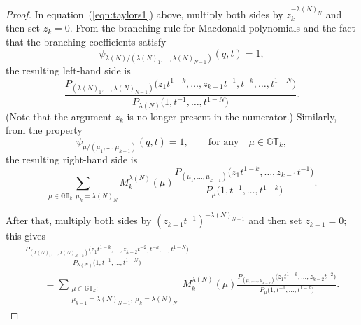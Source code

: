 \documentclass[pdftex]{sigma}
\numberwithin{equation}{section}
\newcommand{\GT}{\mathbb{GT}}
\begin{document}
\begin{proof}
In equation~(\ref{eqn:taylors1}) above, multiply both sides by $z_k^{-\lambda(N)_N}$ and then set $z_k = 0$.
From the branching rule for Macdonald polynomials and the fact that the branching coef\/f\/icients satisfy
\[
\psi_{\lambda(N)/(\lambda(N)_1, \dots, \lambda(N)_{N-1})}(q, t) = 1,
\]
the resulting left-hand side is
\[
\frac{P_{(\lambda(N)_1, \dots, \lambda(N)_{N-1})}\big(z_1 t^{1-k}, \dots, z_{k-1}t^{-1}, t^{-k}, \dots, t^{1-N}\big)}{P_{\lambda(N)}\big(1, t^{-1}, \dots, t^{1-N}\big)}.
\]
(Note that the argument $z_k$ is no longer present in the numerator.) Similarly, from the property
\[
\psi_{\mu/(\mu_1, \dots, \mu_{k-1})}(q, t) = 1, \qquad \textrm{for any} \quad \mu\in\GT_k,
\]
the resulting right-hand side is
\[
\sum_{\mu\in\GT_k\colon \mu_k = \lambda(N)_N}{M_k^{\lambda(N)}(\mu) \frac{P_{(\mu_1, \dots, \mu_{k-1})}\big(z_1t^{1-k}, \dots, z_{k-1}t^{-1}\big)}{P_{\mu}\big(1, t^{-1}, \dots, t^{1-k}\big)}}.
\]

After that, multiply both sides by $(z_{k-1}t^{-1})^{-\lambda(N)_{N-1}}$ and then set $z_{k-1}=0$; this gives
\begin{gather*}
\frac{P_{(\lambda(N)_1, \dots, \lambda(N)_{N-2})}\big(z_1 t^{1-k}, \dots, z_{k-2}t^{-2}, t^{-k}, \dots, t^{1-N}\big)}{P_{\lambda(N)}\big(1, t^{-1}, \dots, t^{1-N}\big)}\\
\qquad{} = \sum_{\substack{ \mu\in\GT_k\colon \\ \mu_{k-1} = \lambda(N)_{N-1},\ \mu_k = \lambda(N)_N } }{M_k^{\lambda(N)}(\mu) \frac{P_{(\mu_1, \dots, \mu_{k-2})}\big(z_1t^{1-k}, \dots, z_{k-2}t^{-2}\big)}{P_{\mu}\big(1, t^{-1}, \dots, t^{1-k}\big)}}.
\end{gather*}


\end{proof}
\end{document}
